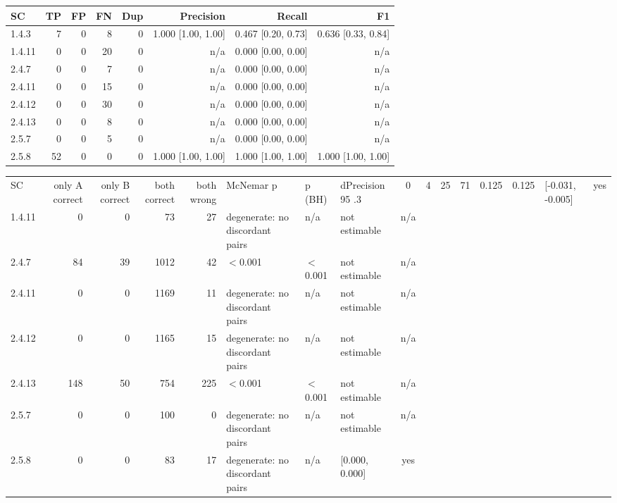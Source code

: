 \begin{tabular}{lrrrrrrr}
\hline
SC & TP & FP & FN & Dup & Precision & Recall & F1 \\
\hline
1.4.3 & 7 & 0 & 8 & 0 & 1.000 [1.00, 1.00] & 0.467 [0.20, 0.73] & 0.636 [0.33, 0.84] \\
1.4.11 & 0 & 0 & 20 & 0 & n/a & 0.000 [0.00, 0.00] & n/a \\
2.4.7 & 0 & 0 & 7 & 0 & n/a & 0.000 [0.00, 0.00] & n/a \\
2.4.11 & 0 & 0 & 15 & 0 & n/a & 0.000 [0.00, 0.00] & n/a \\
2.4.12 & 0 & 0 & 30 & 0 & n/a & 0.000 [0.00, 0.00] & n/a \\
2.4.13 & 0 & 0 & 8 & 0 & n/a & 0.000 [0.00, 0.00] & n/a \\
2.5.7 & 0 & 0 & 5 & 0 & n/a & 0.000 [0.00, 0.00] & n/a \\
2.5.8 & 52 & 0 & 0 & 0 & 1.000 [1.00, 1.00] & 1.000 [1.00, 1.00] & 1.000 [1.00, 1.00] \\
\hline
\end{tabular}

\begin{tabular}{lrrrrlllc}
\hline
SC & only A correct & only B correct & both correct & both wrong & McNemar p & p (BH) & dPrecision 95%
.3 & 0 & 4 & 25 & 71 & 0.125 & 0.125 & [-0.031, -0.005] & yes \\
1.4.11 & 0 & 0 & 73 & 27 & degenerate: no discordant pairs & n/a & not estimable & n/a \\
2.4.7 & 84 & 39 & 1012 & 42 & $<$0.001 & $<$0.001 & not estimable & n/a \\
2.4.11 & 0 & 0 & 1169 & 11 & degenerate: no discordant pairs & n/a & not estimable & n/a \\
2.4.12 & 0 & 0 & 1165 & 15 & degenerate: no discordant pairs & n/a & not estimable & n/a \\
2.4.13 & 148 & 50 & 754 & 225 & $<$0.001 & $<$0.001 & not estimable & n/a \\
2.5.7 & 0 & 0 & 100 & 0 & degenerate: no discordant pairs & n/a & not estimable & n/a \\
2.5.8 & 0 & 0 & 83 & 17 & degenerate: no discordant pairs & n/a & [0.000, 0.000] & yes \\
\hline
\end{tabular}

